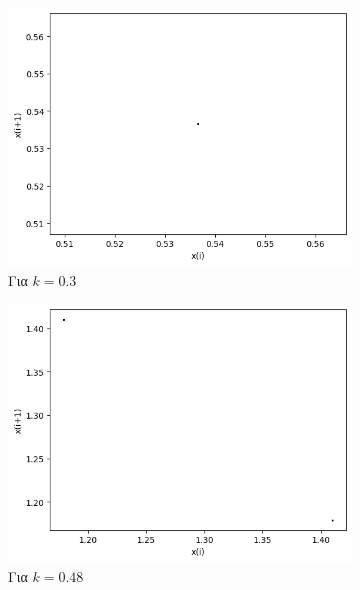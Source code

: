 \begin{figure}[ht]
	\centering
	\begin{subfigure}[b]{0.4\textwidth}
		\centering
		\includegraphics[width=\textwidth]{LateX images/graphs q05/g3}
		\caption{Για $k=0.3$}
		\label{f:k27}
	\end{subfigure}
	\hfill
	\begin{subfigure}[b]{0.4\textwidth}
		\centering
		\includegraphics[width=\textwidth]{LateX images/graphs q05/g4}
		\caption{Για $k=0.48$}
		\label{f:k28}
	\end{subfigure}
	\hfill
	\begin{subfigure}[b]{0.4\textwidth}
		\centering

\end{subfigure}
\end{figure}
